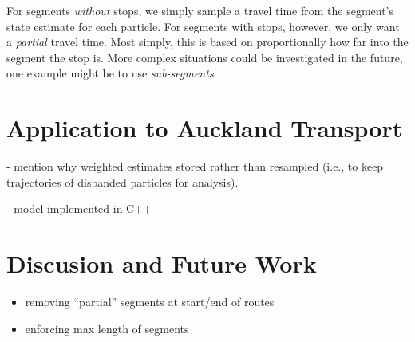 \documentclass[draftcls,a4paper,onecolumn]{IEEEtran}\usepackage[]{graphicx}\usepackage[]{color}
\begin{document}
For segments \emph{without} stops,
we simply sample a travel time from the segment's state estimate
for each particle.
For segments with stops, however,
we only want a \emph{partial} travel time.
Most simply, this is based on proportionally how far into the segment
the stop is.
More complex situations could be investigated in the future,
one example might be to use \emph{sub-segments}.



\section{Application to Auckland Transport}
\label{sec:results}

- mention why weighted estimates stored rather than resampled 
(i.e., to keep trajectories of disbanded particles for analysis).

- model implemented in C++


\section{Discusion and Future Work}
\label{sec:discussion}

\begin{itemize}
\item removing ``partial'' segments at start/end of routes
\item enforcing max length of segments
\end{itemize}







\end{document}

